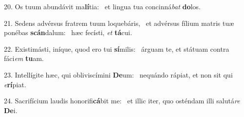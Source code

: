 20. Os tuum abundávit ma\textbf{lí}tia: \ast\  et lingua tua concinná\textit{bat} \textbf{do}los.\

21. Sedens advérsus fratrem tuum loquebáris, \dag\  et advérsus fílium matris tuæ ponébas \textbf{scán}dalum: \ast\  hæc fecísti, \textit{et} \textbf{tá}cui.\

22. Existimásti, iníque, quod ero tui \textbf{sí}milis: \ast\  árguam te, et státuam contra fáci\textit{em} \textbf{tu}am.\

23. Intellígite hæc, qui obliviscímini \textbf{De}um: \ast\  nequándo rápiat, et non sit qui \textit{e}\textbf{rí}piat.\

24. Sacrifícium laudis honorifi\textbf{cá}bit me: \ast\  et illic iter, quo osténdam illi salutá\textit{re} \textbf{De}i.\

